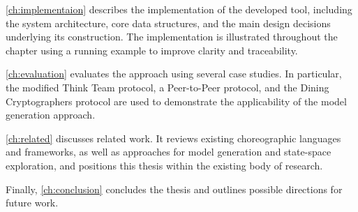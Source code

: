 \cref{ch:implementaion} describes the implementation of the developed tool, including the system architecture, core data structures, and the main design decisions underlying its construction. The implementation is illustrated throughout the chapter using a running example to improve clarity and traceability.

\cref{ch:evaluation} evaluates the approach using several case studies. 
In particular, the modified Think Team protocol, a Peer-to-Peer protocol, and the Dining Cryptographers protocol are used 
to demonstrate the applicability of the model generation approach.

\cref{ch:related} discusses related work. 
It reviews existing choreographic languages and frameworks, as well as approaches for model generation and state-space exploration, and positions this thesis within the existing body of research.

Finally, \cref{ch:conclusion} concludes the thesis and outlines possible directions for future work.

	
